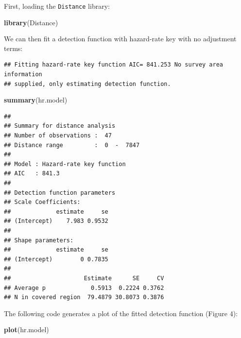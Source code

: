 \documentclass[]{amsart}
\newenvironment{Shaded}{}{}
\newcommand{\KeywordTok}[1]{\textcolor[rgb]{0.00,0.44,0.13}{\textbf{{#1}}}}
\newcommand{\DataTypeTok}[1]{\textcolor[rgb]{0.56,0.13,0.00}{{#1}}}
\newcommand{\StringTok}[1]{\textcolor[rgb]{0.25,0.44,0.63}{{#1}}}
\newcommand{\OtherTok}[1]{\textcolor[rgb]{0.00,0.44,0.13}{{#1}}}
\newcommand{\NormalTok}[1]{{#1}}
\begin{document}
First, loading the \texttt{Distance} library:

\begin{Shaded}
\begin{Highlighting}[]
\KeywordTok{library}\NormalTok{(Distance)}
\end{Highlighting}
\end{Shaded}

We can then fit a detection function with hazard-rate key with no
adjustment terms:

\begin{Shaded}
\end{Shaded}

\begin{verbatim}
## Fitting hazard-rate key function AIC= 841.253 No survey area information
## supplied, only estimating detection function.
\end{verbatim}

\begin{Shaded}
\begin{Highlighting}[]
\KeywordTok{summary}\NormalTok{(hr.model)}
\end{Highlighting}
\end{Shaded}

\begin{verbatim}
## 
## Summary for distance analysis 
## Number of observations :  47 
## Distance range         :  0  -  7847 
## 
## Model : Hazard-rate key function 
## AIC   : 841.3 
## 
## Detection function parameters
## Scale Coefficients:  
##             estimate     se
## (Intercept)    7.983 0.9532
## 
## Shape parameters:  
##             estimate     se
## (Intercept)        0 0.7835
## 
##                     Estimate      SE     CV
## Average p             0.5913  0.2224 0.3762
## N in covered region  79.4879 30.8073 0.3876
\end{verbatim}

The following code generates a plot of the fitted detection function
(Figure 4):

\begin{Shaded}
\begin{Highlighting}[]
\KeywordTok{plot}\NormalTok{(hr.model)}
\end{Highlighting}
\end{Shaded}
\end{document}
